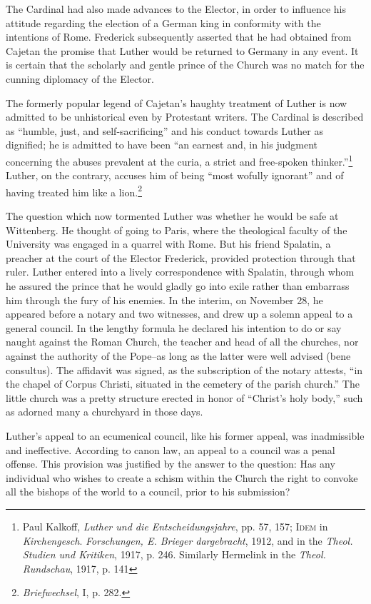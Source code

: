 The Cardinal had also made advances to the Elector, in order to
influence his attitude regarding the election of a German king in
conformity with the intentions of Rome. Frederick subsequently
asserted that he had obtained from Cajetan the promise that Luther
would be returned to Germany in any event. It is certain that the
scholarly and gentle prince of the Church was no match for the
cunning diplomacy of the Elector.

The formerly popular legend of Cajetan’s haughty treatment of
Luther is now admitted to be unhistorical even by Protestant writers.
The Cardinal is described as “humble, just, and self-sacrificing” and
his conduct towards Luther as dignified; he is admitted to have been
“an earnest and, in his judgment concerning the abuses prevalent
at the curia, a strict and free-spoken thinker.”\footnote{Paul Kalkoff, \textit{Luther und die Entscheidungsjahre}, pp. 57, 157; \textsc{Idem} in \textit{Kirchengesch}.
\textit{Forschungen, E. Brieger dargebracht}, 1912, and in the \textit{Theol. Studien und Kritiken}, 1917,
p. 246. Similarly Hermelink in the \textit{Theol. Rundschau}, 1917, p. 141}
Luther, on the
contrary, accuses him of being “most wofully ignorant” and of having
treated him like a lion.\footnote{\textit{Briefwechsel}, I, p. 282.}

The question which now tormented Luther was whether he would
be safe at Wittenberg. He thought of going to Paris, where the
theological faculty of the University was engaged in a quarrel with
Rome. But his friend Spalatin, a preacher at the court of the Elector
Frederick, provided protection through that ruler. Luther entered
into a lively correspondence with Spalatin, through whom he assured
the prince that he would gladly go into exile rather than embarrass
him through the fury of his enemies. In the interim, on November
28, he appeared before a notary and two witnesses, and drew up a
solemn appeal to a general council. In the lengthy formula he declared
his intention to do or say naught against the Roman Church, the
teacher and head of all the churches, nor against the authority of
the Pope--as long as the latter were well advised (bene consultus).
The affidavit was signed, as the subscription of the notary attests, “in
the chapel of Corpus Christi, situated in the cemetery of the parish
church.” The little church was a pretty structure erected in honor
of “Christ’s holy body,” such as adorned many a churchyard in those
days.

Luther’s appeal to an ecumenical council, like his former appeal,
was inadmissible and ineffective. According to canon law, an appeal
to a council was a penal offense. This provision was justified by the
answer to the question: Has any individual who wishes to create a
schism within the Church the right to convoke all the bishops of
the world to a council, prior to his submission?


